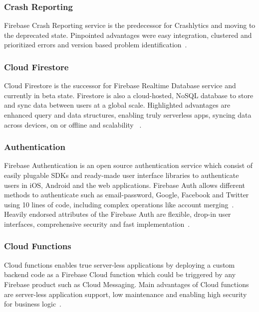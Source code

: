 \subsubsection{Crash Reporting}
Firebase Crash Reporting service is the predecessor for Crashlytics and moving 
to the deprecated state. Pinpointed advantages were easy integration, clustered 
and prioritized errors and version based problem 
identification~\cite{hid-sp18-409-www-firebase-products}.

\subsubsection{Cloud Firestore}
Cloud Firestore is the successor for Firebase Realtime Database service and 
currently in beta state. Firestore is also a cloud-hosted, NoSQL database to 
store and sync data between users at a global scale. Highlighted advantages are 
enhanced query and data structures, enabling truly serverless apps,  syncing 
data across devices, on or offline and scalability 
~\cite{hid-sp18-409-www-firebase-official, hid-sp18-409-www-firebase-products}. 

\subsubsection{Authentication}
Firebase Authentication is an open source authentication service which consist 
of easily plugable SDKs and ready-made user interface libraries to authenticate 
users in iOS, Android and the web applications. Firebase Auth allows different 
methods to authenticate such as email-password, Google, Facebook and Twitter 
using 10 lines of code, including complex operations like account 
merging~\cite{hid-sp18-409-www-firebase-products}. Heavily endorsed attributes 
of the Firebase Auth are flexible, drop-in user interfaces, comprehensive 
security and fast implementation~\cite{hid-sp18-409-www-firebase-wikipedia}.

\subsubsection{Cloud Functions}
Cloud functions enables true server-less applications by deploying a custom 
backend code as a Firebase Cloud function which could be triggered by any 
Firebase product such as Cloud Messaging. Main advantages of Cloud functions 
are server-less application support, low maintenance and enabling high security 
for business logic~\cite{hid-sp18-409-www-firebase-products}.

